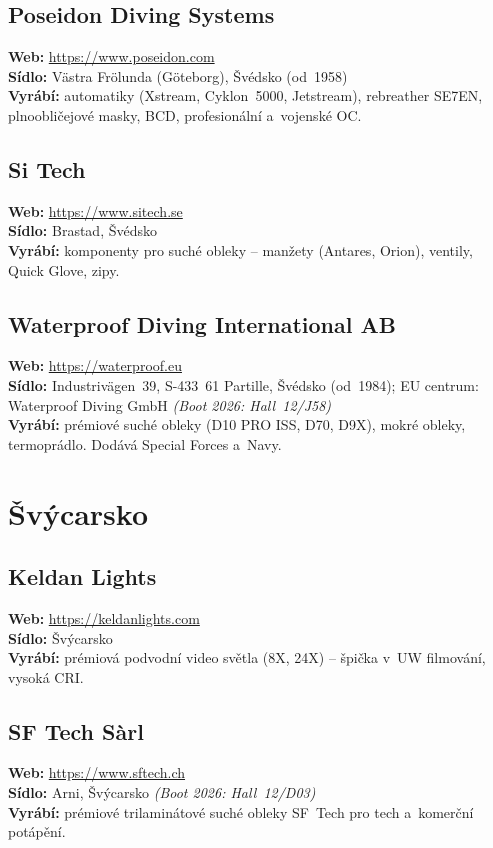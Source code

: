 \documentclass[11pt,a4paper]{article}
\begin{document}
\subsection{Poseidon Diving Systems}
\textbf{Web:} \url{https://www.poseidon.com} \\
\textbf{Sídlo:} Västra Frölunda (Göteborg), Švédsko (od~1958) \\
\textbf{Vyrábí:} automatiky (Xstream, Cyklon~5000, Jetstream), rebreather SE7EN, plnoobličejové masky, BCD, profesionální a~vojenské OC.

\subsection{Si Tech}
\textbf{Web:} \url{https://www.sitech.se} \\
\textbf{Sídlo:} Brastad, Švédsko \\
\textbf{Vyrábí:} komponenty pro suché obleky -- manžety (Antares, Orion), ventily, Quick Glove, zipy.

\subsection{Waterproof Diving International AB}
\textbf{Web:} \url{https://waterproof.eu} \\
\textbf{Sídlo:} Industrivägen~39, S-433~61 Partille, Švédsko (od~1984); EU centrum: Waterproof Diving GmbH \quad\emph{(Boot 2026: Hall~12/J58)} \\
\textbf{Vyrábí:} prémiové suché obleky (D10 PRO ISS, D70, D9X), mokré obleky, termoprádlo. Dodává Special Forces a~Navy.

\section{Švýcarsko}

\subsection{Keldan Lights}
\textbf{Web:} \url{https://keldanlights.com} \\
\textbf{Sídlo:} Švýcarsko \\
\textbf{Vyrábí:} prémiová podvodní video světla (8X, 24X) -- špička v~UW filmování, vysoká CRI.

\subsection{SF Tech Sàrl}
\textbf{Web:} \url{https://www.sftech.ch} \\
\textbf{Sídlo:} Arni, Švýcarsko \quad\emph{(Boot 2026: Hall~12/D03)} \\
\textbf{Vyrábí:} prémiové trilaminátové suché obleky SF~Tech pro tech a~komerční potápění.
\end{document}
